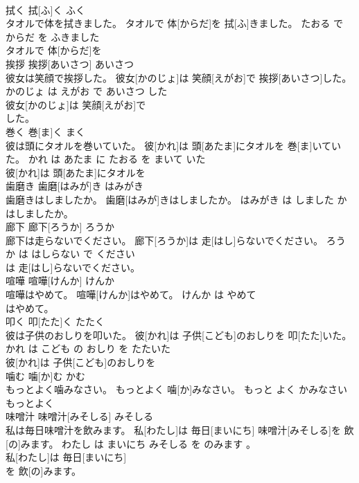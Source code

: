 \documentclass[8pt]{extreport}
\begin{document}
\begin{CJK}{UTF8}{min}
\\	拭く	拭[ふ]く	ふく	
\\	タオルで体を拭きました。	タオルで 体[からだ]を 拭[ふ]きました。	たおる で からだ を ふきました	
\\	タオルで 体[からだ]を
\\	挨拶	挨拶[あいさつ]	あいさつ	
\\	彼女は笑顔で挨拶した。	彼女[かのじょ]は 笑顔[えがお]で 挨拶[あいさつ]した。	かのじょ は えがお で あいさつ した	
\\	彼女[かのじょ]は 笑顔[えがお]で
\\	した。			
\\	巻く	巻[ま]く	まく	
\\	彼は頭にタオルを巻いていた。	彼[かれ]は 頭[あたま]にタオルを 巻[ま]いていた。	かれ は あたま に たおる を まいて いた	
\\	彼[かれ]は 頭[あたま]にタオルを
\\	歯磨き	歯磨[はみが]き	はみがき	
\\	歯磨きはしましたか。	歯磨[はみが]きはしましたか。	はみがき は しました か	
\\	はしましたか。			
\\	廊下	廊下[ろうか]	ろうか	
\\	廊下は走らないでください。	廊下[ろうか]は 走[はし]らないでください。	ろうか は はしらない で ください	
\\	は 走[はし]らないでください。			
\\	喧嘩	喧嘩[けんか]	けんか	
\\	喧嘩はやめて。	喧嘩[けんか]はやめて。	けんか は やめて	
\\	はやめて。			
\\	叩く	叩[たた]く	たたく	
\\	彼は子供のおしりを叩いた。	彼[かれ]は 子供[こども]のおしりを 叩[たた]いた。	かれ は こども の おしり を たたいた	
\\	彼[かれ]は 子供[こども]のおしりを
\\	噛む	噛[か]む	かむ	
\\	もっとよく噛みなさい。	もっとよく 噛[か]みなさい。	もっと よく かみなさい	
\\	もっとよく
\\	味噌汁	味噌汁[みそしる]	みそしる	
\\	私は毎日味噌汁を飲みます。	私[わたし]は 毎日[まいにち] 味噌汁[みそしる]を 飲[の]みます。	わたし は まいにち みそしる を のみます 。	
\\	私[わたし]は 毎日[まいにち]
\\	を 飲[の]みます。			

\end{CJK}
\end{document}
